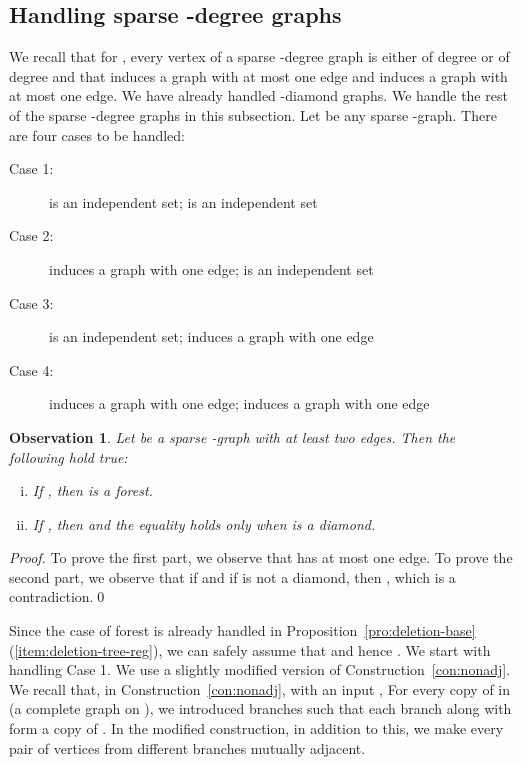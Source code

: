 \documentclass[envcountsame,envcountsect,10pt,oribibl]{llncs}
\newtheorem{observation}[lemma]{Observation}
\begin{document}
\subsection{Handling sparse -degree graphs}
\label{sec:sparselh}

We recall that for , 
every vertex of a sparse -degree graph  is either of degree 
or of degree  and that  induces a graph with at most one edge and 
induces a graph with at most one edge. We have already handled -diamond graphs.
We handle the rest of the sparse -degree graphs in this subsection.
Let  be any sparse -graph.
There are four cases to be handled:
\begin{description}
\item[Case 1:]  is an independent set;  is an independent set
\item[Case 2:]  induces a graph with one edge;  is an independent set
\item[Case 3:]  is an independent set;  induces a graph with one edge
\item[Case 4:]  induces a graph with one edge;  induces a graph with one edge
\end{description}

\begin{observation}
  \label{obs:sparselh}
  Let  be a sparse -graph with at least two edges. Then the following hold true:
  \begin{enumerate}[(i)]
  \item\label{item:sparselh-1} If , then  is a forest.
  \item\label{item:sparselh-2} If , then  and the equality holds only when  is a diamond.
  \end{enumerate}
\end{observation}
\begin{proof}
  To prove the first part, we observe that 
  has at most one edge. 
  To prove the second part, we observe that if  and if  is not a diamond, then ,
  which is a contradiction.\qed
\end{proof}

Since the case of forest is already handled in Proposition~\ref{pro:deletion-base}(\ref{item:deletion-tree-reg}),
we can safely assume that  and hence .
We start with handling Case 1.
We use a slightly modified 
version of Construction~\ref{con:nonadj}. 
We recall that, in Construction~\ref{con:nonadj}, with an input ,
For every copy  of  in  (a complete graph on ), we introduced  branches such that
each branch along with  form a copy of . 
In the modified
construction, in addition to this, we make every pair of vertices from different branches mutually adjacent.
\end{document}
